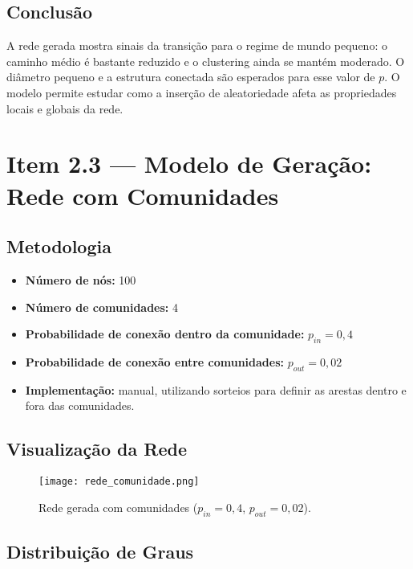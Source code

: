 \documentclass{article}
\begin{document}
\subsection*{Conclusão}

A rede gerada mostra sinais da transição para o regime de mundo pequeno: o caminho médio é bastante reduzido e o clustering ainda se mantém moderado. O diâmetro pequeno e a estrutura conectada são esperados para esse valor de \( p \). O modelo permite estudar como a inserção de aleatoriedade afeta as propriedades locais e globais da rede.

\newpage

\section*{Item 2.3 — Modelo de Geração: Rede com Comunidades}

\subsection*{Metodologia}

\begin{itemize}
    \item \textbf{Número de nós:} 100
    \item \textbf{Número de comunidades:} 4
    \item \textbf{Probabilidade de conexão dentro da comunidade:} \(p_{in} = 0{,}4\)
    \item \textbf{Probabilidade de conexão entre comunidades:} \(p_{out} = 0{,}02\)
    \item \textbf{Implementação:} manual, utilizando sorteios para definir as arestas dentro e fora das comunidades.
\end{itemize}

\subsection*{Visualização da Rede}

\begin{figure}[h]
\centering
\texttt{[image: rede\_comunidade.png]}
\caption{Rede gerada com comunidades (\(p_{in} = 0{,}4\), \(p_{out} = 0{,}02\)).}
\end{figure}

\subsection*{Distribuição de Graus}
\end{document}
